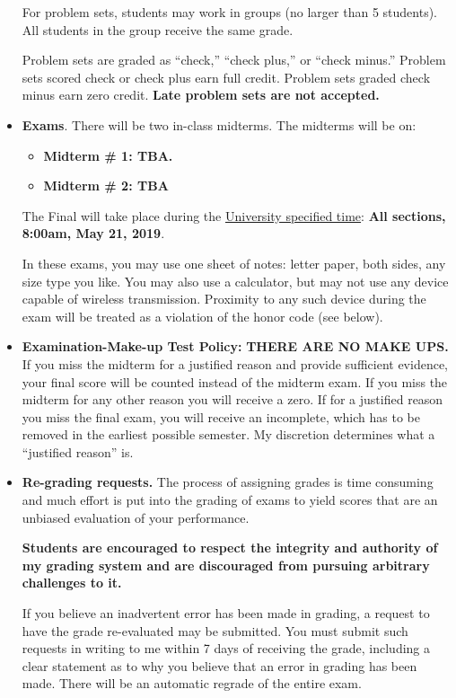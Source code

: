 \documentclass[12pt,pdftex,twoside,letterpaper]{exam}
\begin{document}
\begin{itemize}
    For problem sets, students may work in groups (no larger than 5 students). All students in the group receive the same grade.

    Problem sets are graded as ``check,'' ``check plus,'' or ``check minus.'' Problem sets scored check or check plus earn full credit. Problem sets graded check minus earn zero credit. \textbf{Late problem sets are not accepted.}

\item \textbf{Exams}. There will be two in-class midterms. The midterms will be on:
\begin{itemize}
\item\textbf{ Midterm \# 1: TBA.}
\item\textbf{ Midterm \# 2: TBA}
\end{itemize}
The Final will take place during the \href{http://www.nyu.edu/registrar/pdf/Final_exam_schedule_Spring_2019.pdf}{University specified time}: \textbf{All sections, 8:00am, May 21, 2019}.

In these exams, you may use one sheet of notes: letter paper, both sides, any size type you like. You may also use a calculator, but may not use any device capable of wireless transmission.  Proximity to any such device during the exam will be treated as a violation of the honor code (see below).

\item \textbf{Examination-Make-up Test Policy:} \textbf{THERE ARE NO MAKE UPS.}\\

If you miss the midterm for a justified reason and provide sufficient evidence, your final score will be counted instead of the midterm exam. If you miss the midterm for any other reason you will receive a zero. If for a justified reason you miss the final exam, you will receive an incomplete, which has to be removed in the earliest possible semester. My discretion determines what a ``justified reason'' is. 

\item \textbf{Re-grading requests.} The process of assigning grades is time consuming and much effort is put into the grading of exams to yield scores that are an unbiased evaluation of your performance.

    \textbf{Students are encouraged to respect the integrity and authority of my grading system and are discouraged from pursuing arbitrary challenges to it.}

If you believe an inadvertent error has been made in grading, a request to have the grade re-evaluated may be submitted. You must submit such requests in writing to me within 7 days of receiving the grade, including a clear statement as to why you believe that an error in grading has been made. There will be an automatic regrade of the entire exam.

\end{itemize}
\end{document}
